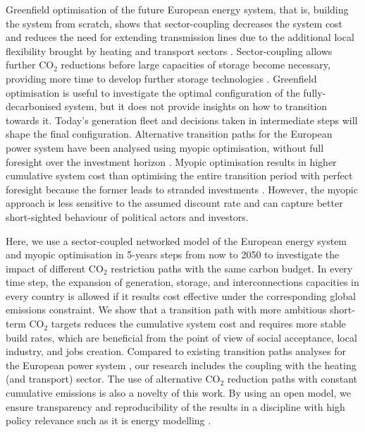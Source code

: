 \documentclass[5p]{elsarticle} %
\begin{document}
Greenfield optimisation of the future European energy system, that is, building the system from scratch, shows that sector-coupling decreases the system cost and reduces the need for extending transmission lines due to the additional local flexibility brought by heating and transport sectors \cite{Brown_2018}. Sector-coupling allows further CO$_2$ reductions before large capacities of storage become necessary, providing more time to develop further storage technologies \cite{Victoria_storage}. Greenfield optimisation is useful to investigate the optimal configuration of the fully-decarbonised system, but it does not provide insights on how to transition towards it. Today's generation fleet and decisions taken in intermediate steps will shape the final configuration. 
Alternative transition paths for the European power system have been analysed using myopic optimisation, without full foresight over the investment horizon \cite{Bogdanov_2019, Plesmann_2017, Gerbaulet_2019, Poncelet_2016}. Myopic optimisation results in higher cumulative system cost than optimising the entire transition period with perfect foresight because the former leads to stranded investments \cite{Gerbaulet_2019, Heuberger_2018}. However, the myopic approach is less sensitive to the assumed discount rate and can capture better short-sighted behaviour of political actors and investors. 

Here, we use a sector-coupled networked model of the European energy system and myopic optimisation in 5-years steps from now to 2050 to investigate the impact of different CO$_2$ restriction paths with the same carbon budget. In every time step, the expansion of generation, storage, and interconnections capacities in every country is allowed  if it results cost effective under the corresponding global emissions constraint. We show that a transition path with more ambitious short-term CO$_2$ targets reduces the cumulative system cost and requires more stable build rates, which are beneficial from the point of view of social acceptance, local industry, and jobs creation. Compared to existing transition paths analyses for the European power system \cite{Plesmann_2017, Gerbaulet_2019, Poncelet_2016}, our research includes the coupling with the heating \textcolor[rgb]{1,0,0}{(and transport)} sector. The use of alternative CO$_2$ reduction paths with constant cumulative emissions is also a novelty of this work. By using an open model, we ensure transparency and reproducibility of the results in a  discipline with high policy relevance such as it is energy modelling \cite{Pfenninger_2017, Pfenninger_2018}. 
\end{document}
